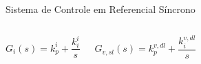 \begin{frame}{Sistema de Controle em Referencial Síncrono}
\begin{columns}
\begin{equation*}
G_i(s) = k_p^i + \frac{k_i^i}{s}
\end{equation*} 


\begin{equation*}
G_{v,sl}(s) = k_p^{v,dl} + \frac{k_i^{v,dl}}{s}
\end{equation*} 

\end{columns}


\end{frame}




%
%
%
%


